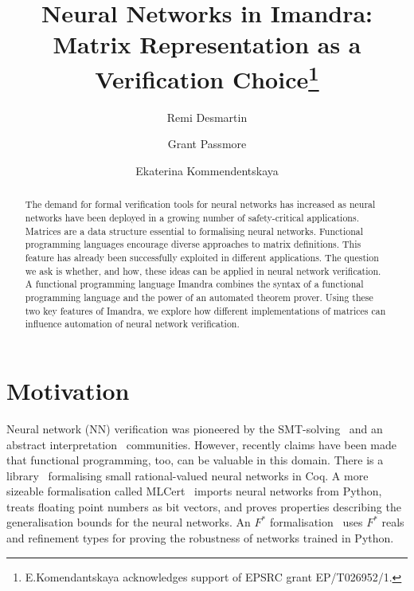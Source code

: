 \documentclass[runningheads]{llncs}
\begin{document}
%
\title{Neural Networks in Imandra: Matrix Representation as a Verification Choice\thanks{E.Komendantskaya acknowledges support of EPSRC grant EP/T026952/1.}}
%
%
\author{Remi Desmartin \and
Grant Passmore\and
Ekaterina Kommendentskaya}
%
%
%
\maketitle              %
%
\begin{abstract}
The demand for formal verification tools for neural networks has increased as
neural networks have been deployed in a growing number of safety-critical
applications. Matrices are a data structure essential to formalising neural
networks. Functional programming languages encourage diverse approaches to
matrix definitions. This feature has already been successfully exploited in
different applications. The question we ask is whether, and how, these ideas can
be applied in neural network verification. A functional programming language
Imandra combines the syntax of a functional programming language and the power
of an automated theorem prover. Using these two key features of Imandra, we
explore how different implementations of matrices can influence automation of
neural network verification.

\end{abstract}
%
%
%

\section{Motivation}

Neural network (NN) verification was pioneered by the
SMT-solving~\cite{KaBaDiJuKo17Reluplex,HuangKWW17} and an abstract
interpretation~\cite{SinghGPV19,GeMiDrTsChVe18,AEHW20} communities. However, recently claims have been made that functional programming, too, can be valuable in this domain. 
 There is a library~\cite{MariaBLFGRG22}
formalising small rational-valued neural networks in Coq. A more sizeable
formalisation called MLCert~\cite{BS19} imports neural networks from Python, treats
floating point numbers as bit vectors, and proves properties describing the
generalisation bounds for the neural networks.
%
An $F^*$ %
%
formalisation~\cite{KokkeKKAA20} uses $F^*$ reals and
refinement types for proving the robustness of networks trained in Python.
\end{document}
